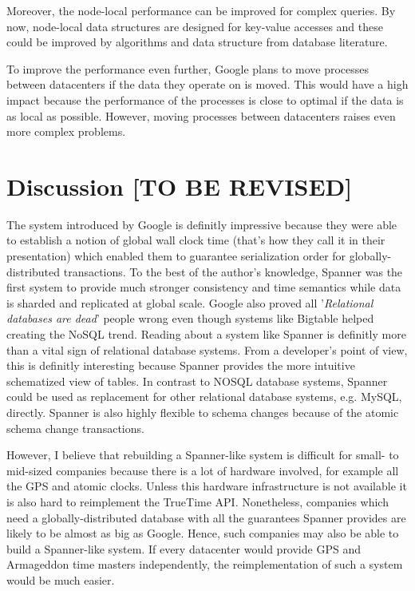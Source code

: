 \documentclass[onecolumn, a4paper, 10pt]{article}
\newcommand{\tbr}{{\color{red}\textbf{[TO BE REVISED]}}}
\begin{document}
Moreover, the node-local performance can be improved for complex queries. By now,
node-local data structures are designed for key-value accesses and these could be
improved by algorithms and data structure from database literature.

To improve the performance even further, Google plans to move processes between
datacenters if the data they operate on is moved. This would have a high impact
because the performance of the processes is close to optimal if the data is as
local as possible. However, moving processes between datacenters raises even more
complex problems.

\section{Discussion \tbr}
\label{sec:discussion}

The system introduced by Google is definitly impressive because they were able
to establish a notion of global wall clock time (that's how they call it in their
presentation) which enabled them to guarantee serialization order for
globally-distributed transactions. To the best of the author's knowledge, Spanner
was the first system to provide much stronger consistency and time semantics while
data is sharded and replicated at global scale. Google also proved all
'\emph{Relational databases are dead}' people wrong even though systems like
Bigtable helped creating the NoSQL trend. Reading about a system like Spanner is
definitly more than a vital sign of relational database systems. From a
developer's point of view, this is definitly interesting because Spanner provides
the more intuitive schematized view of tables. In contrast to NOSQL database
systems, Spanner could be used as replacement for other relational database
systems, e.g. MySQL, directly. Spanner is also highly flexible to schema changes
because of the atomic schema change transactions.

However, I believe that rebuilding a Spanner-like system is difficult for
small- to mid-sized companies because there is a lot of hardware involved, for
example all the GPS and atomic clocks. Unless this hardware infrastructure is
not available it is also hard to reimplement the TrueTime API. Nonetheless,
companies which need a globally-distributed database with all the guarantees
Spanner provides are likely to be almost as big as Google. Hence, such companies
may also be able to build a Spanner-like system. If every datacenter would provide
GPS and Armageddon time masters independently, the reimplementation of such a
system would be much easier.
\end{document}
